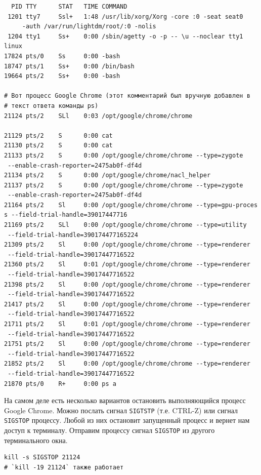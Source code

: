 \documentclass[12pt]{article}
\begin{document}
\begin{verbatim}
  PID TTY      STAT   TIME COMMAND
 1201 tty7     Ssl+   1:48 /usr/lib/xorg/Xorg -core :0 -seat seat0
     -auth /var/run/lightdm/root/:0 -nolis
 1204 tty1     Ss+    0:00 /sbin/agetty -o -p -- \u --noclear tty1 linux
17824 pts/0    Ss     0:00 -bash
18747 pts/1    Ss+    0:00 /bin/bash
19664 pts/2    Ss+    0:00 -bash

# Вот процесс Google Chrome (этот комментарий был вручную добавлен в
# текст ответа команды ps)
21124 pts/2    SLl    0:03 /opt/google/chrome/chrome

21129 pts/2    S      0:00 cat
21130 pts/2    S      0:00 cat
21133 pts/2    S      0:00 /opt/google/chrome/chrome --type=zygote
 --enable-crash-reporter=2475ab0f-df4d
21134 pts/2    S      0:00 /opt/google/chrome/nacl_helper
21137 pts/2    S      0:00 /opt/google/chrome/chrome --type=zygote
 --enable-crash-reporter=2475ab0f-df4d
21164 pts/2    Sl     0:00 /opt/google/chrome/chrome --type=gpu-proces
s --field-trial-handle=39017447716
21169 pts/2    SLl    0:00 /opt/google/chrome/chrome --type=utility
 --field-trial-handle=390174477165224
21309 pts/2    Sl     0:00 /opt/google/chrome/chrome --type=renderer
 --field-trial-handle=39017447716522
21360 pts/2    Sl     0:01 /opt/google/chrome/chrome --type=renderer
 --field-trial-handle=39017447716522
21398 pts/2    Sl     0:00 /opt/google/chrome/chrome --type=renderer
 --field-trial-handle=39017447716522
21417 pts/2    Sl     0:00 /opt/google/chrome/chrome --type=renderer
 --field-trial-handle=39017447716522
21711 pts/2    Sl     0:01 /opt/google/chrome/chrome --type=renderer
 --field-trial-handle=39017447716522
21751 pts/2    Sl     0:00 /opt/google/chrome/chrome --type=renderer
 --field-trial-handle=39017447716522
21852 pts/2    Sl     0:00 /opt/google/chrome/chrome --type=renderer
 --field-trial-handle=39017447716522
21870 pts/0    R+     0:00 ps a
\end{verbatim}

На самом деле есть несколько вариантов остановить выполняющийся процесс
Google Chrome. Можно послать сигнал \texttt{SIGTSTP} (т.е. CTRL-Z) или
сигнал \texttt{SIGSTOP} процессу. Любой из них остановит запущенный
процесс и вернет нам доступ к терминалу. Отправим процессу сигнал
\texttt{SIGSTOP} из другого терминального окна.

\begin{verbatim}
kill -s SIGSTOP 21124
# `kill -19 21124` также работает
\end{verbatim}
\end{document}
